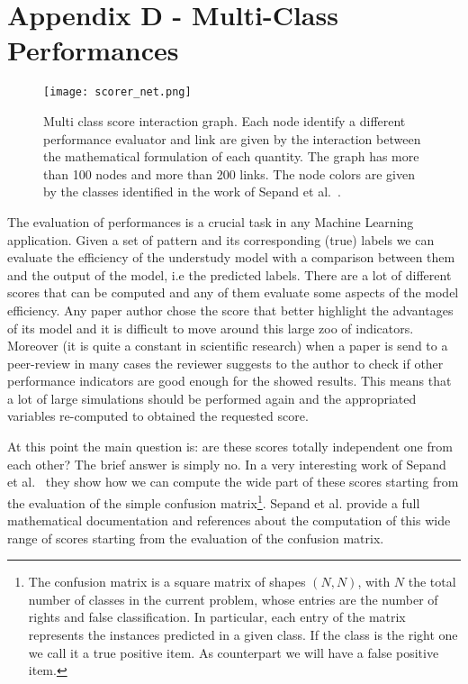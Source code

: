 \documentclass{standalone}
\begin{document}
\chapter*{Appendix D - Multi-Class Performances}

\begin{center}
\begin{figure}[htbp]
\centering
\texttt{[image: scorer\_net.png]}
\caption{Multi class score interaction graph.
Each node identify a different performance evaluator and link are given by the interaction between the mathematical formulation of each quantity.
The graph has more than 100 nodes and more than 200 links.
The node colors are given by the classes identified in the work of Sepand et al.~\cite{PyCM}.
}
\label{fig:scorer_net}
\end{figure}
\end{center}

The evaluation of performances is a crucial task in any Machine Learning application.
Given a set of pattern and its corresponding (true) labels we can evaluate the efficiency of the understudy model with a comparison between them and the output of the model, i.e the predicted labels.
There are a lot of different scores that can be computed and any of them evaluate some aspects of the model efficiency.
Any paper author chose the score that better highlight the advantages of its model and it is difficult to move around this large zoo of indicators.
Moreover (it is quite a constant in scientific research) when a paper is send to a peer-review in many cases the reviewer suggests to the author to check if other performance indicators are good enough for the showed results.
This means that a lot of large simulations should be performed again and the appropriated variables re-computed to obtained the requested score.

At this point the main question is: are these scores totally independent one from each other?
The brief answer is simply no.
In a very interesting work of Sepand et al.~\cite{PyCM} they show how we can compute the wide part of these scores starting from the evaluation of the simple confusion matrix\footnote{
  The confusion matrix is a square matrix of shapes $(N, N)$, with $N$ the total number of classes in the current problem, whose entries are the number of rights and false classification.
  In particular, each entry of the matrix represents the instances predicted in a given class.
  If the class is the right one we call it a true positive item.
  As counterpart we will have a false positive item.
}.
Sepand et al. provide a full mathematical documentation and references about the computation of this wide range of scores starting from the evaluation of the confusion matrix.
\end{document}
